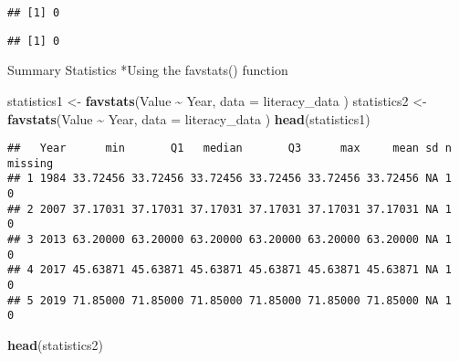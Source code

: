 \documentclass[
]{article}
\newenvironment{Shaded}{\begin{snugshade}}{\end{snugshade}}
\newcommand{\AttributeTok}[1]{\textcolor[rgb]{0.13,0.29,0.53}{#1}}
\newcommand{\FunctionTok}[1]{\textcolor[rgb]{0.13,0.29,0.53}{\textbf{#1}}}
\newcommand{\NormalTok}[1]{#1}
\newcommand{\OtherTok}[1]{\textcolor[rgb]{0.56,0.35,0.01}{#1}}
\newcommand{\SpecialCharTok}[1]{\textcolor[rgb]{0.81,0.36,0.00}{\textbf{#1}}}
\begin{document}
\begin{Shaded}
\end{Shaded}

\begin{verbatim}
## [1] 0
\end{verbatim}

\begin{Shaded}
\end{Shaded}

\begin{verbatim}
## [1] 0
\end{verbatim}

Summary Statistics *Using the favstats() function

\begin{Shaded}
\begin{Highlighting}[]
\NormalTok{statistics1 }\OtherTok{\textless{}{-}} \FunctionTok{favstats}\NormalTok{(Value }\SpecialCharTok{\textasciitilde{}}\NormalTok{ Year, }\AttributeTok{data =}\NormalTok{ literacy\_data )}
\NormalTok{statistics2 }\OtherTok{\textless{}{-}} \FunctionTok{favstats}\NormalTok{(Value }\SpecialCharTok{\textasciitilde{}}\NormalTok{ Year, }\AttributeTok{data =}\NormalTok{ literacy\_data )}
\FunctionTok{head}\NormalTok{(statistics1)}
\end{Highlighting}
\end{Shaded}

\begin{verbatim}
##   Year      min       Q1   median       Q3      max     mean sd n missing
## 1 1984 33.72456 33.72456 33.72456 33.72456 33.72456 33.72456 NA 1       0
## 2 2007 37.17031 37.17031 37.17031 37.17031 37.17031 37.17031 NA 1       0
## 3 2013 63.20000 63.20000 63.20000 63.20000 63.20000 63.20000 NA 1       0
## 4 2017 45.63871 45.63871 45.63871 45.63871 45.63871 45.63871 NA 1       0
## 5 2019 71.85000 71.85000 71.85000 71.85000 71.85000 71.85000 NA 1       0
\end{verbatim}

\begin{Shaded}
\begin{Highlighting}[]
\FunctionTok{head}\NormalTok{(statistics2)}
\end{Highlighting}
\end{Shaded}
\end{document}
